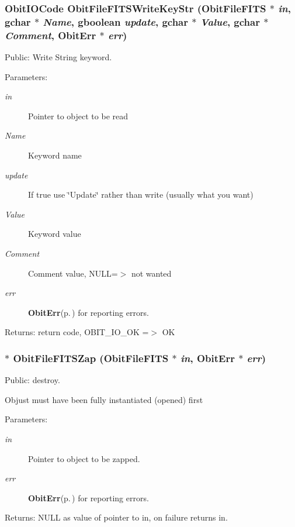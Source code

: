 \subsubsection{\setlength{\rightskip}{0pt plus 5cm}Obit\-IOCode Obit\-File\-FITSWrite\-Key\-Str ({\bf Obit\-File\-FITS} $\ast$ {\em in}, gchar $\ast$ {\em Name}, gboolean {\em update}, gchar $\ast$ {\em Value}, gchar $\ast$ {\em Comment}, {\bf Obit\-Err} $\ast$ {\em err})}\label{ObitFileFITS_8h_a19}


Public: Write String keyword. 

\begin{Desc}
\item[Parameters:]
\begin{description}
\item[{\em in}]Pointer to object to be read \item[{\em Name}]Keyword name \item[{\em update}]If true use \char`\"{}Update\char`\"{} rather than write (usually what you want) \item[{\em Value}]Keyword value \item[{\em Comment}]Comment value, NULL=$>$ not wanted \item[{\em err}]{\bf Obit\-Err}{\rm (p.\,\pageref{structObitErr})} for reporting errors. \end{description}
\end{Desc}
\begin{Desc}
\item[Returns:]return code, OBIT\_\-IO\_\-OK =$>$ OK \end{Desc}
\subsubsection{$\ast$ Obit\-File\-FITSZap ({\bf Obit\-File\-FITS} $\ast$ {\em in}, {\bf Obit\-Err} $\ast$ {\em err})}\label{ObitFileFITS_8h_a6}


Public: destroy. 

Objust must have been fully instantiated (opened) first \begin{Desc}
\item[Parameters:]
\begin{description}
\item[{\em in}]Pointer to object to be zapped. \item[{\em err}]{\bf Obit\-Err}{\rm (p.\,\pageref{structObitErr})} for reporting errors. \end{description}
\end{Desc}
\begin{Desc}
\item[Returns:]NULL as value of pointer to in, on failure returns in. \end{Desc}
